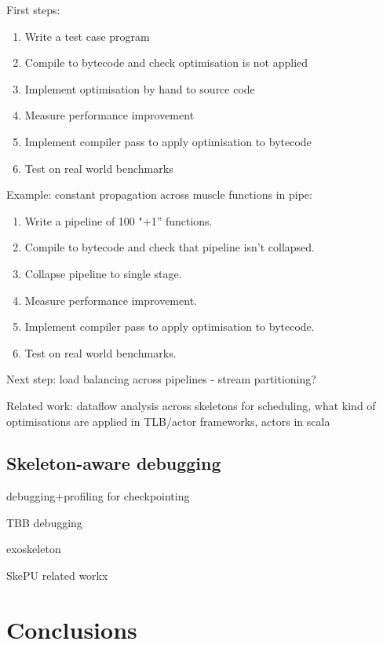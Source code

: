 First steps:
%
\begin{enumerate}
\item Write a test case program
\item Compile to bytecode and check optimisation is not applied
\item Implement optimisation by hand to source code
\item Measure performance improvement
\item Implement compiler pass to apply optimisation to bytecode
\item Test on real world benchmarks
\end{enumerate}
%
Example: constant propagation across muscle functions in pipe:
%
\begin{enumerate}
\item Write a pipeline of 100 "+1” functions.
\item Compile to bytecode and check that pipeline isn’t collapsed.
\item Collapse pipeline to single stage.
\item Measure performance improvement.
\item Implement compiler pass to apply optimisation to bytecode.
\item Test on real world benchmarks.
\end{enumerate}
%
Next step: load balancing across pipelines - stream partitioning?

Related work: dataflow analysis across skeletons for scheduling, what
kind of optimisations are applied in TLB/actor frameworks, actors in
scala


\subsection{Skeleton-aware debugging}
debugging+profiling for checkpointing

TBB debugging

exoskeleton

SkePU related workx


\section{Conclusions}


\label{bibliography}
\printbibliography



